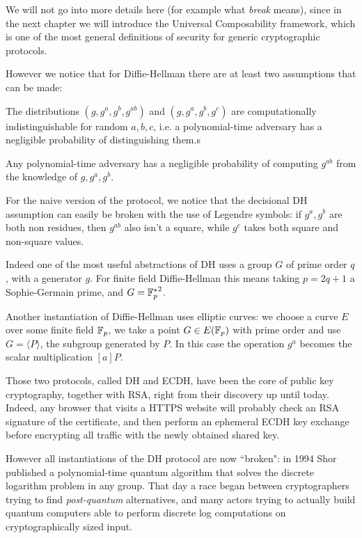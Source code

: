 We will not go into more details here (for example what \emph{break} means), since in the next chapter we will introduce the Universal Composability framework, which is one of the most general definitions of security for generic cryptographic protocols.

However we notice that for Diffie-Hellman there are at least two assumptions that can be made:
\begin{assumption}[DDH]
    The distributions $(g,g^a,g^b,g^{ab})$ and $(g,g^a,g^b,g^c)$ are computationally indistinguishable for random $a,b,c$, i.e. a polynomial-time adversary has a negligible probability of distinguishing them.s
\end{assumption}
\begin{assumption}[CDH]
    Any polynomial-time adversary has a negligible probability of computing $g^{ab}$ from the knowledge of $g,g^a,g^b$.
\end{assumption}

For the naive version of the protocol, we notice that the decisional DH assumption can easily be broken with the use of Legendre symbols: if $g^a,g^b$ are both non residues, then $g^{ab}$ also isn't a square, while $g^c$ takes both square and non-square values.

Indeed one of the most useful abstractions of DH uses a group $G$ of prime order $q$, with a generator $g$. For finite field Diffie-Hellman this means taking $p=2q+1$ a Sophie-Germain prime, and $G={\mathbb{F}_p^\ast}^2$.

Another instantiation of Diffie-Hellman uses elliptic curves: we choose a curve $E$ over some finite field $\mathbb{F}_p$, we take a point $G\in E(\mathbb{F}_p)$ with prime order and use $G=\langle P\rangle$, the subgroup generated by $P$. In this case the operation $g^a$ becomes the scalar multiplication $[a]P$.

Those two protocols, called DH and ECDH, have been the core of public key cryptography, together with RSA, right from their discovery up until today. Indeed, any browser that visits a HTTPS website will probably check an RSA signature of the certificate, and then perform an ephemeral ECDH key exchange before encrypting all traffic with the newly obtained shared key.

However all instantiations of the DH protocol are now ``broken": in 1994 Shor published a polynomial-time quantum algorithm \cite{Shor94} that solves the discrete logarithm problem in any group. That day a race began between cryptographers trying to find \emph{post-quantum} alternatives, and many actors trying to actually build quantum computers able to perform discrete log computations on cryptographically sized input.

